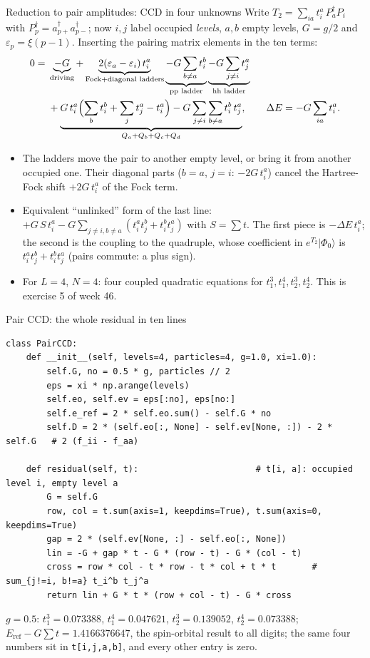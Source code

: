 \documentclass[aspectratio=169,10pt]{beamer}
\newcommand{\numbox}[1]{%
  \begin{tcolorbox}[colback=palegreen,colframe=teal!70!black,title={\bfseries Measured}]
  #1
  \end{tcolorbox}}
\newcommand{\ket}[1]{\vert #1\rangle}
\newcommand{\cre}[1]{a_{#1}^{\dagger}}
\newcommand{\Eref}{E_{\mathrm{ref}}}
\newcommand{\ph}{\Phi_0}
\begin{document}
\begin{frame}[shrink=3]{Reduction to pair amplitudes: CCD in four unknowns}
\small
Write $T_2=\sum_{ia}t_i^a\,P_a^\dagger P_i$ with $P_p^\dagger=\cre{p+}\cre{p-}$; now $i,j$ label occupied \emph{levels}, $a,b$ empty levels, $G=g/2$ and $\varepsilon_p=\xi(p-1)$. Inserting the pairing matrix elements in the ten terms:
\begin{align*}
 0={}&\underbrace{-G}_{\text{driving}}
 +\underbrace{2(\varepsilon_a-\varepsilon_i)\,t_i^a}_{\text{Fock}+\text{diagonal ladders}}
 \underbrace{-G\sum_{b\ne a}t_i^b}_{\text{pp ladder}}
 \underbrace{-G\sum_{j\ne i}t_j^a}_{\text{hh ladder}}\\
 &+\underbrace{G\,t_i^a\Bigl(\sum_bt_i^b+\sum_jt_j^a-t_i^a\Bigr)-G\sum_{j\ne i}\sum_{b\ne a}t_i^b\,t_j^a}_{Q_a+Q_b+Q_c+Q_d},
 \qquad \Delta E=-G\sum_{ia}t_i^a .
\end{align*}
\begin{itemize}
\item The ladders move the pair to another empty level, or bring it from another occupied one. Their diagonal parts ($b=a$, $j=i$: $-2G\,t_i^a$) cancel the Hartree-Fock shift $+2G\,t_i^a$ of the Fock term.
\item Equivalent ``unlinked'' form of the last line: $+G\,S\,t_i^a-G\sum_{j\ne i,b\ne a}(t_i^at_j^b+t_i^bt_j^a)$ with $S=\sum t$. The first piece is $-\Delta E\,t_i^a$; the second is the coupling to the quadruple, whose coefficient in $e^{T_2}\ket{\ph}$ is $t_i^at_j^b+t_i^bt_j^a$ (pairs commute: a plus sign).
\item For $L=4$, $N=4$: four coupled quadratic equations for $t_1^3,t_1^4,t_2^3,t_2^4$. This is exercise 5 of week 46.
\end{itemize}
\end{frame}

\begin{frame}[fragile,shrink=7]{Pair CCD: the whole residual in ten lines}
\begin{lstlisting}[style=mid]
class PairCCD:
    def __init__(self, levels=4, particles=4, g=1.0, xi=1.0):
        self.G, no = 0.5 * g, particles // 2
        eps = xi * np.arange(levels)
        self.eo, self.ev = eps[:no], eps[no:]
        self.e_ref = 2 * self.eo.sum() - self.G * no
        self.D = 2 * (self.eo[:, None] - self.ev[None, :]) - 2 * self.G   # 2 (f_ii - f_aa)

    def residual(self, t):                       # t[i, a]: occupied level i, empty level a
        G = self.G
        row, col = t.sum(axis=1, keepdims=True), t.sum(axis=0, keepdims=True)
        gap = 2 * (self.ev[None, :] - self.eo[:, None])
        lin = -G + gap * t - G * (row - t) - G * (col - t)
        cross = row * col - t * row - t * col + t * t       # sum_{j!=i, b!=a} t_i^b t_j^a
        return lin + G * t * (row + col - t) - G * cross
\end{lstlisting}
\numbox{\small $g=0.5$: $t_1^3=0.073388$, $t_1^4=0.047621$, $t_2^3=0.139052$, $t_2^4=0.073388$; $\Eref-G\sum t=1.4166376647$, the spin-orbital result to all digits; the same four numbers sit in \texttt{t[i,j,a,b]}, and every other entry is zero.}
\end{frame}
\end{document}
